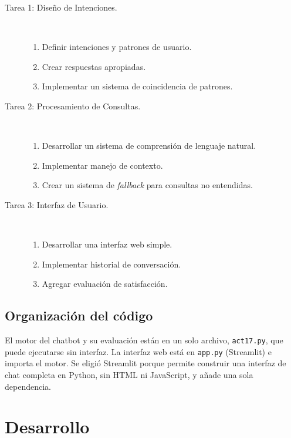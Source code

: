 \documentclass[11pt,letterpaper]{article}
\begin{document}
\begin{description}
    \item[Tarea 1: Diseño de Intenciones.]\mbox{}\\[-1.3\baselineskip]
    \begin{enumerate}
        \item Definir intenciones y patrones de usuario.
        \item Crear respuestas apropiadas.
        \item Implementar un sistema de coincidencia de patrones.
    \end{enumerate}
    \item[Tarea 2: Procesamiento de Consultas.]\mbox{}\\[-1.3\baselineskip]
    \begin{enumerate}
        \item Desarrollar un sistema de comprensión de lenguaje natural.
        \item Implementar manejo de contexto.
        \item Crear un sistema de \textit{fallback} para consultas no entendidas.
    \end{enumerate}
    \item[Tarea 3: Interfaz de Usuario.]\mbox{}\\[-1.3\baselineskip]
    \begin{enumerate}
        \item Desarrollar una interfaz web simple.
        \item Implementar historial de conversación.
        \item Agregar evaluación de satisfacción.
    \end{enumerate}
\end{description}

\subsection*{Organización del código}

El motor del chatbot y su evaluación están en un solo archivo, \texttt{act17.py}, que puede ejecutarse sin interfaz. La interfaz web está en \texttt{app.py} (Streamlit) e importa el motor. Se eligió Streamlit porque permite construir una interfaz de chat completa en Python, sin HTML ni JavaScript, y añade una sola dependencia.

\section{Desarrollo}
\end{document}
